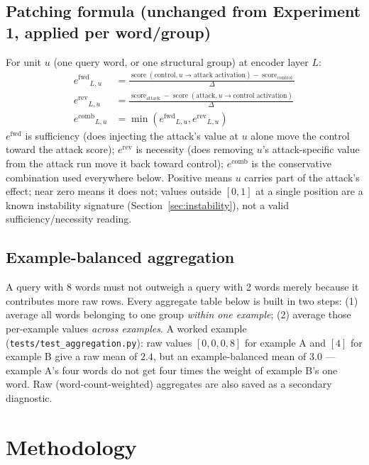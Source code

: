 \documentclass[11pt]{article}
\newcommand{\fwd}{\ensuremath{e^{\mathrm{fwd}}}}
\newcommand{\rev}{\ensuremath{e^{\mathrm{rev}}}}
\newcommand{\score}{\operatorname{score}}
\newcommand{\comb}{\ensuremath{e^{\mathrm{comb}}}}
\begin{document}
\subsection{Patching formula (unchanged from Experiment 1, applied per word/group)}

For unit $u$ (one query word, or one structural group) at encoder layer $L$:
\begin{align}
\fwd_{L,u} &= \frac{\score(\text{control}, u \to \text{attack activation}) - \score_{\text{control}}}{\Delta} \label{eq:wfwd}\\
\rev_{L,u} &= \frac{\score_{\text{attack}} - \score(\text{attack}, u \to \text{control activation})}{\Delta} \label{eq:wrev}\\
\comb_{L,u} &= \min(\fwd_{L,u}, \rev_{L,u}) \label{eq:wcomb}
\end{align}
$\fwd$ is sufficiency (does injecting the attack's value at $u$ alone move the control
toward the attack score); $\rev$ is necessity (does removing $u$'s attack-specific value
from the attack run move it back toward control); $\comb$ is the conservative combination
used everywhere below. Positive means $u$ carries part of the attack's effect; near zero
means it does not; values outside $[0,1]$ at a single position are a known instability
signature (Section~\ref{sec:instability}), not a valid sufficiency/necessity reading.

\subsection{Example-balanced aggregation}

A query with 8 words must not outweigh a query with 2 words merely because it contributes
more raw rows. Every aggregate table below is built in two steps: (1) average all words
belonging to one group \emph{within one example}; (2) average those per-example values
\emph{across examples}. A worked example (\texttt{tests/test\_aggregation.py}): raw values
$[0,0,0,8]$ for example A and $[4]$ for example B give a raw mean of $2.4$, but an
example-balanced mean of $3.0$ — example A's four words do not get four times the weight
of example B's one word. Raw (word-count-weighted) aggregates are also saved as a
secondary diagnostic.

\section{Methodology}
\end{document}
